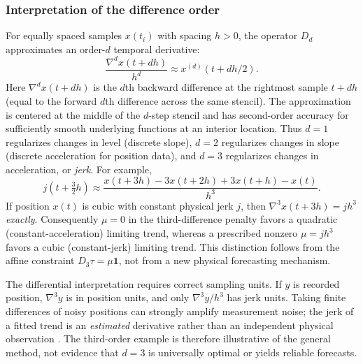 \subsubsection{Interpretation of the difference order}
\label{sec:order-interpretation}
For equally spaced samples $x(t_i)$ with spacing $h>0$,
the operator $D_d$ approximates an order-$d$ temporal derivative:
\begin{equation}\label{eq:difference-derivative-approximation}
\frac{\nabla^d x(t+dh)}{h^d}\approx x^{(d)}(t+dh/2).
\end{equation}
Here $\nabla^d x(t+dh)$ is the $d$th backward difference
at the rightmost sample $t+dh$ (equal to the forward
$d$th difference across the same stencil).
The approximation is centered at the middle of the $d$-step
stencil and has second-order accuracy for sufficiently
smooth underlying functions at an interior location.
Thus $d=1$ regularizes changes in level (discrete slope),
$d=2$ regularizes changes in slope (discrete acceleration
for position data), and $d=3$ regularizes
changes in acceleration, or \emph{jerk}.
For example,
\begin{equation}\label{eq:discrete-jerk}
j\!\left(t+\tfrac32h\right)
\approx
\frac{x(t+3h)-3x(t+2h)+3x(t+h)-x(t)}{h^3}.
\end{equation}
If position $x(t)$ is cubic with constant physical jerk $j$,
then $\nabla^3 x(t+3h)=jh^3$ \emph{exactly}. Consequently
$\mu=0$ in the third-difference penalty favors a
quadratic (constant-acceleration) limiting trend, whereas
a prescribed nonzero $\mu=jh^3$ favors a cubic
(constant-jerk) limiting trend. This distinction follows
from the affine constraint $D_3\tau=\mu\mathbf1$,
not from a new physical forecasting mechanism.

The differential interpretation requires correct sampling
units. If $y$ is recorded position, $\nabla^3 y$ is in
position units, and only $\nabla^3 y/h^3$ has jerk units.
Taking finite differences of noisy positions can strongly
amplify measurement noise; the jerk of a fitted trend is an
\emph{estimated} derivative rather than an independent
physical observation \citep{vanbreugel2020}.
The third-order example is therefore illustrative of the
general method, not evidence that $d=3$ is universally
optimal or yields reliable forecasts.


